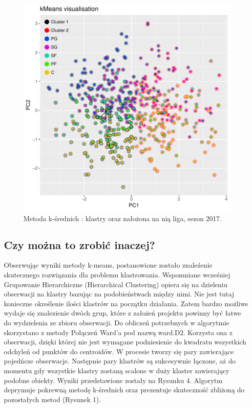 \documentclass[twoside,twocolumn]{article}
\begin{document}
\begin{figure}[hbt!]
  \centering
    \includegraphics[width=\linewidth]{plot_kclust.pdf}
  \caption{Metoda k-średnich : klastry oraz nałożona na nią liga, sezon 2017.}
  \label{fig:coffee}
\end{figure}
\newpage
\subsection{Czy można to zrobić inaczej?}

\indent Obserwując wyniki metody k-means, postanowione zostało znaleźenie skutecznego rozwiązania dla problemu klastrowania. Wspomniane wcześniej Grupowanie Hierarchiczne (Hierarchical Clustering) opiera się na dzieleniu obserwacji na klastry bazując na podobieństwach między nimi. Nie jest tutaj konieczne określenie ilości klastrów na początku działania. Zatem bardzo możliwe wydaje się znalezienie dwóch grup, które z założeń projektu powinny być łatwe do wydzielenia ze zbioru obserwacji. Do obliczeń potrzebnych w algorytmie  skorzystano z metody Połączeń Ward'a pod nazwą ward.D2. Korzysta ona z obserwacji, dzięki której nie jest wymagane podniesienie do kwadratu wszystkich odchyleń od punktów do centroidów. W procesie tworzy się pary zawierające pojedńcze obserwacje. Następnie pary klastrów są sukcesywnie łączone, aż do momentu gdy wszystkie klastry zostaną scalone w duży klaster zawierający podobne obiekty. Wyniki przedstawione zostały na Rysunku 4. Algorytm deprymuje pokrewną metodę k-średnich oraz prezentuje skuteczność zbliżoną do pozostałych metod (Rysunek 1).
\end{document}
